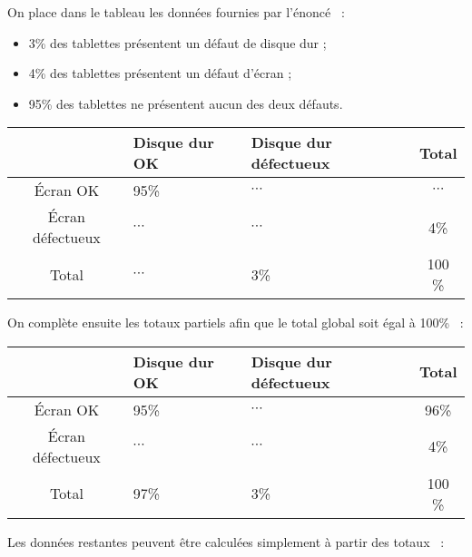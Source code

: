\begin{corrige}
\begin{enumerate}
          On place dans le tableau les données fournies par l'énoncé ~:
          \par
          \begin{itemize}
               \item %
               3\% des tablettes présentent un défaut de disque dur ;
               \item %
               4\% des tablettes présentent un défaut d'écran ;
               \item %
               95\% des tablettes ne présentent aucun des deux défauts.
          \end{itemize}
          \begin{center}
               \begin{tabular}{|c|p{2cm}|p{2cm}|c|}%
                    \hline
                    $\ $ & Disque dur OK & Disque dur défectueux & Total \\
                    \hline
                    \'Ecran OK &  95\% & $\cdots$ & $\cdots$ \\
                    \hline
                    \'Ecran défectueux & $\cdots$ & $\cdots$ & 4\% \\
                    \hline
                    Total & $\cdots$ & 3\% & 100 \% \\
                    \hline
               \end{tabular}
          \end{center}
          On complète ensuite les totaux partiels afin que le total global soit égal à 100\% ~:
          \begin{center}
               \begin{tabular}{|c|p{2cm}|p{2cm}|c|}%
                    \hline
                    $\ $ & Disque dur OK & Disque dur défectueux & Total \\
                    \hline
                    \'Ecran OK &  95\% & $\cdots$ & 96\% \\
                    \hline
                    \'Ecran défectueux & $\cdots$ & $\cdots$ & 4\% \\
                    \hline
                    Total & 97\% & 3\% & 100 \% \\
                    \hline
               \end{tabular}
          \end{center}
          Les données restantes peuvent être calculées simplement à partir des totaux ~:
          \begin{center}

\end{center}
\end{enumerate}
\end{corrige}
